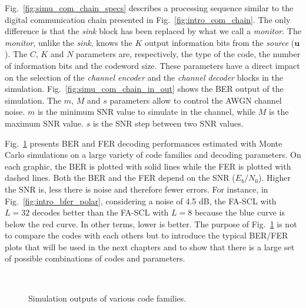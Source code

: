 Fig.~\ref{fig:simu_com_chain_specs} describes a processing sequence similar
to the digital communication chain presented in Fig.~\ref{fig:intro_com_chain}.
The only difference is that the \emph{sink} block has been replaced by what we
call a \emph{monitor}. The \emph{monitor}, unlike the \emph{sink}, knows the $K$
output information bits from the \emph{source} ($\bm{u}$). The $C$, $K$ and $N$
parameters are, respectively, the type of the code, the number of information
bits and the codeword size. These parameters have a direct impact on the
selection of the \emph{channel encoder} and the \emph{channel decoder} blocks
in the simulation. Fig.~\ref{fig:simu_com_chain_in_out} shows the BER output of
the simulation. The $m$, $M$ and $s$ parameters allow to control the AWGN
channel noise. $m$ is the minimum SNR value to simulate in the channel, while
$M$ is the maximum SNR value. $s$ is the SNR step between two SNR values.

Fig.~\ref{fig:intro_bfer} presents BER and FER decoding performances estimated
with Monte Carlo simulations on a large variety of code families and decoding
parameters. On each graphic, the BER is plotted with solid lines while the FER
is plotted with dashed lines. Both the BER and the FER depend on the SNR
($E_b/N_0$). Higher the SNR is, less there is noise and therefore fewer errors.
For instance, in Fig.~\ref{fig:intro_bfer_polar}, considering a noise of 4.5 dB,
the FA-SCL with $L = 32$ decodes better than the FA-SCL with $L = 8$ because
the {\color{Paired-1} blue} curve is below the {\color{Paired-5} red} curve. In
other terms, lower is better. The purpose of Fig.~\ref{fig:intro_bfer} is not
to compare the codes with each others but to introduce the typical BER/FER plots
that will be used in the next chapters and to show that there is a large set of
possible combinations of codes and parameters.

\begin{figure}[htp]
  \centering
    \quad{}
     \quad{}
    \\
      \quad{}
   \quad{}
  \caption{Simulation outputs of various code families.}
  \label{fig:intro_bfer}
\end{figure}


